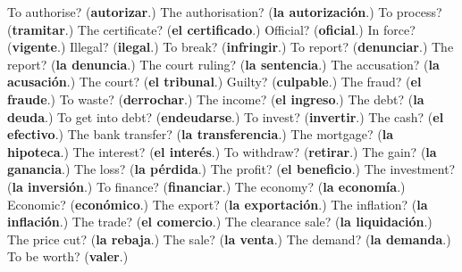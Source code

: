 \begin{tcolorbox}[breakable,colback=teal!4,colframe=teal!35!black,title={Before you move on}]
To authorise? (\textbf{autorizar}.) The authorisation? (\textbf{la autorización}.) To process? (\textbf{tramitar}.) The certificate? (\textbf{el certificado}.) Official? (\textbf{oficial}.) In force? (\textbf{vigente}.) Illegal? (\textbf{ilegal}.) To break? (\textbf{infringir}.) To report? (\textbf{denunciar}.) The report? (\textbf{la denuncia}.) The court ruling? (\textbf{la sentencia}.) The accusation? (\textbf{la acusación}.) The court? (\textbf{el tribunal}.) Guilty? (\textbf{culpable}.) The fraud? (\textbf{el fraude}.) To waste? (\textbf{derrochar}.) The income? (\textbf{el ingreso}.) The debt? (\textbf{la deuda}.) To get into debt? (\textbf{endeudarse}.) To invest? (\textbf{invertir}.) The cash? (\textbf{el efectivo}.) The bank transfer? (\textbf{la transferencia}.) The mortgage? (\textbf{la hipoteca}.) The interest? (\textbf{el interés}.) To withdraw? (\textbf{retirar}.) The gain? (\textbf{la ganancia}.) The loss? (\textbf{la pérdida}.) The profit? (\textbf{el beneficio}.) The investment? (\textbf{la inversión}.) To finance? (\textbf{financiar}.) The economy? (\textbf{la economía}.) Economic? (\textbf{económico}.) The export? (\textbf{la exportación}.) The inflation? (\textbf{la inflación}.) The trade? (\textbf{el comercio}.) The clearance sale? (\textbf{la liquidación}.) The price cut? (\textbf{la rebaja}.) The sale? (\textbf{la venta}.) The demand? (\textbf{la demanda}.) To be worth? (\textbf{valer}.)
\end{tcolorbox}
